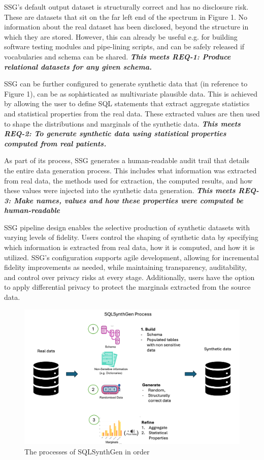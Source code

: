 \documentclass[11pt]{article}
\begin{document}
SSG's default output dataset is structurally correct and has no disclosure risk. These are datasets that sit on the far left end of the spectrum in Figure 1. No information about the real dataset has been disclosed, beyond the structure in which they are stored. However, this can already be useful e.g. for building software testing modules and pipe-lining scripts, and can be safely released if vocabularies and schema can be shared. \textbf{\textit{This meets REQ-1: Produce relational datasets for any given schema.}}

SSG can be further configured to generate synthetic data that (in reference to Figure 1), can be as sophisticated as multivariate plausible data. This is achieved by allowing the user to define SQL statements that extract aggregate statistics and statistical properties from the real data. These extracted values are then used to shape the distributions and marginals of the synthetic data. \textbf{\textit{This meets REQ-2: To generate synthetic data using statistical properties computed from real patients.}} 

As part of its process, SSG generates a human-readable audit trail that details the entire data generation process. This includes what information was extracted from real data, the methods used for extraction, the computed results, and how these values were injected into the synthetic data generation. \textbf{\textit{This meets REQ-3: Make names, values and how these properties were computed be human-readable}}

SSG pipeline design enables the selective production of synthetic datasets with varying levels of fidelity. Users control the shaping of synthetic data by specifying which information is extracted from real data, how it is computed, and how it is utilized. SSG’s configuration supports agile development, allowing for incremental fidelity improvements as needed, while maintaining transparency, auditability, and control over privacy risks at every stage. Additionally, users have the option to apply differential privacy to protect the marginals extracted from the source data.

\begin{figure}[ht]
\centering
\includegraphics[width=0.8\linewidth]{figures/Process.png}
\caption{The processes of SQLSynthGen in order}
\label{fig:SSG Process}
\end{figure}
\end{document}
